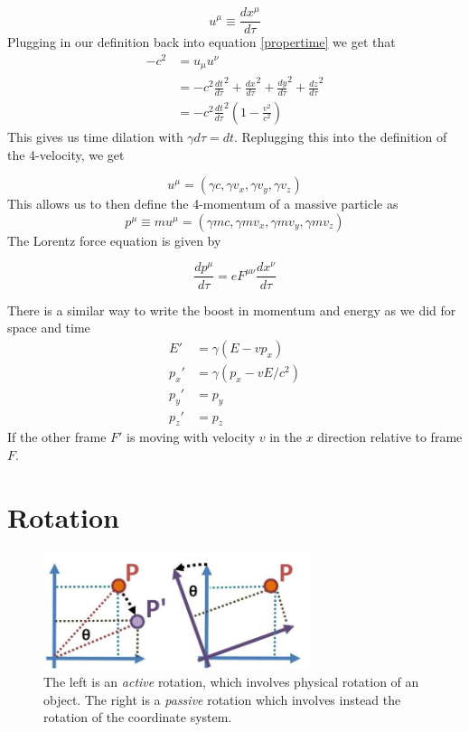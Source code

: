 $$u^\mu \equiv \frac{d x^\mu}{d\tau}$$
Plugging in our definition back into equation \ref{propertime} we get that 
\begin{align}
-c^2 &= u_\mu u^\nu\\
 &= -c^2\frac{d t}{d \tau}^2 + \frac{d x}{d \tau}^2 + \frac{d y}{d \tau}^2 + \frac{d z}{d \tau}^2\\
 &= -c^2\frac{d t}{d \tau}^2(1- \frac{v^2}{c^2}) 
\end{align}
This gives us time dilation with $\gamma d\tau = dt$. Replugging this into the definition of the 4-velocity, we get

$$u^\mu = (\gamma c, \gamma v_x, \gamma v_y,\gamma v_z)$$
This allows us to then define the 4-momentum of a massive particle as 
$$p^\mu \equiv mu^\mu = (\gamma mc, \gamma mv_x, \gamma mv_y,\gamma mv_z)$$
The Lorentz force equation is given by

$$\frac{dp^\mu}{d\tau} = eF^{\mu\nu}\frac{dx^\nu}{d\tau}$$


There is a similar way to write the boost in momentum and energy as we did for space and time
\begin{align}
    E' &= \gamma(E - vp_x)\\
    p_x' &= \gamma(p_x - vE/c^2)\\
    p_y' &= p_y\\
    p_z' &= p_z
\end{align}
If the other frame $F'$ is moving with velocity $v$ in the $x$ direction relative to frame $F$.


\section{Rotation}\label{classicalrot}



\begin{figure}\label{rotation}
\centerline{\includegraphics[width=0.7\textwidth]{physics/images/rotation}}
\caption{The left is an \emph{active} rotation, which involves physical rotation of an object. The right is a \emph{passive} rotation which involves instead the rotation of the coordinate system.}
\end{figure}

